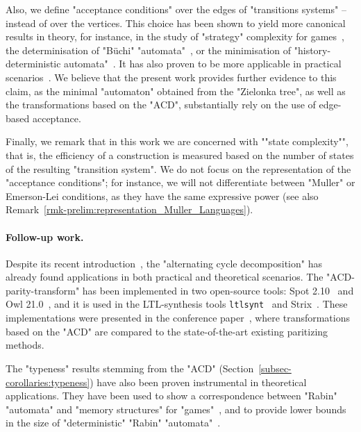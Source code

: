 \documentclass{theoretics}
\begin{document}
Also, we define "acceptance conditions" over the edges of "transitions systems" -- instead of over the vertices. This choice has been shown to yield more canonical results in theory, for instance, in the study of "strategy" complexity for games~\cite{BCRV22HalfPosBuchi,Casares2021Chromatic,CN06,Zielonka1998infinite}, the determinisation of "B\"uchi" "automata"~\cite{Colcombetz2009tight,Varghese14Determinising}, or the minimisation of "history-deterministic automata"~\cite{AK22MinimizingGFG,EhlersSchewe22NaturalColors}. It has also proven to be more applicable in practical scenarios~\cite{Spot2.10CAV22,GiannakopoulouLerda2002Transitions}.  We believe that the present work provides further evidence to this claim, as the minimal "automaton" obtained from the "Zielonka tree", as well as the transformations based on the "ACD", substantially rely on the use of edge-based acceptance. 

\AP Finally, we remark that in this work we are concerned with ""state complexity"", that is, the efficiency of a construction is measured based on the number of states of the resulting "transition system". We do not focus on the representation of the "acceptance conditions"; for instance, we will not differentiate between "Muller" or Emerson-Lei conditions, as they have the same expressive power (see also Remark~\ref{rmk-prelim:representation_Muller_Languages}).




\paragraph*{Follow-up work.}

Despite its recent introduction~\cite{CCF21Optimal}, the "alternating cycle decomposition" has already found applications in both practical and theoretical scenarios.
The "ACD-parity-transform" has been implemented in two open-source tools: Spot 2.10~\cite{Spot2.10CAV22} and Owl 21.0~\cite{KMS18Owl}, and it is used in the LTL-synthesis tools \texttt{ltlsynt}~\cite{Spot2.10CAV22} and Strix~\cite{MS21ModernisingStrix}. These implementations were presented in the conference paper~\cite{CDMRS22Tacas}, where transformations based on the "ACD" are compared to the state-of-the-art existing paritizing methods.

The "typeness" results stemming from the "ACD" (Section~\ref{subsec-corollaries:typeness}) have also been proven instrumental in theoretical applications. They have been used to show a correspondence between "Rabin" "automata" and "memory structures" for "games"~\cite{Casares2021Chromatic}, and to provide lower bounds in the size of "deterministic" "Rabin" "automata"~\cite{CCL22SizeGFG}.
\end{document}
